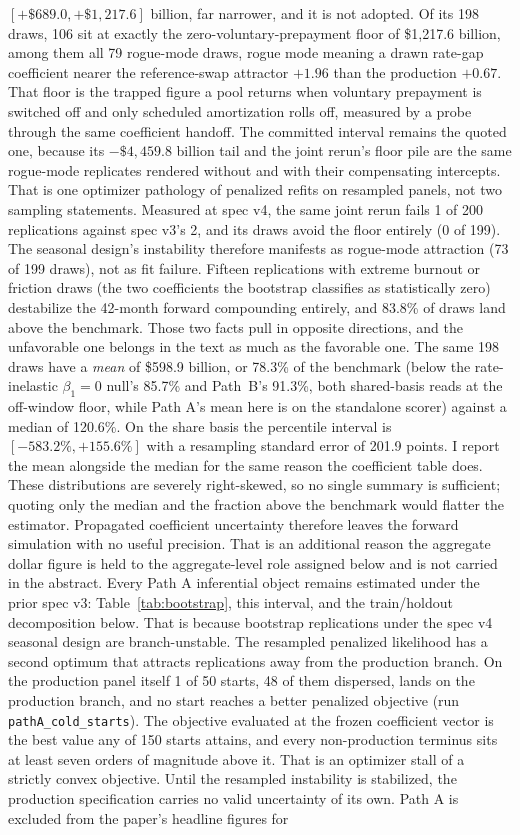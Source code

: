 \documentclass[12pt]{article}
\begin{document}
$[+\$689.0, +\$1{,}217.6]$ billion, far narrower, and it is not adopted. Of its 198 draws, 106 sit at exactly the zero-voluntary-prepayment floor of \$1{,}217.6 billion, among them all 79 rogue-mode draws, rogue mode meaning a drawn rate-gap coefficient nearer the reference-swap attractor $+1.96$ than the production $+0.67$. That floor is the trapped figure a pool returns when voluntary prepayment is switched off and only scheduled amortization rolls off, measured by a probe through the same coefficient handoff. The committed interval remains the quoted one, because its $-\$4{,}459.8$ billion tail and the joint rerun's floor pile are the same rogue-mode replicates rendered without and with their compensating intercepts. That is one optimizer pathology of penalized refits on resampled panels, not two sampling statements. Measured at spec v4, the same joint rerun fails 1 of 200 replications against spec v3's 2, and its draws avoid the floor entirely (0 of 199). The seasonal design's instability therefore manifests as rogue-mode attraction (73 of 199 draws), not as fit failure. Fifteen replications with extreme burnout or friction draws (the two coefficients the bootstrap classifies as statistically zero) destabilize the 42-month forward compounding entirely, and 83.8\% of draws land above the benchmark. Those two facts pull in opposite directions, and the unfavorable one belongs in the text as much as the favorable one. The same 198 draws have a \emph{mean} of \$598.9 billion, or 78.3\% of the benchmark (below the rate-inelastic $\beta_1 = 0$ null's 85.7\% and Path~B's 91.3\%, both shared-basis reads at the off-window floor, while Path A's mean here is on the standalone scorer) against a median of 120.6\%. On the share basis the percentile interval is $[-583.2\%, +155.6\%]$ with a resampling standard error of 201.9 points. I report the mean alongside the median for the same reason the coefficient table does. These distributions are severely right-skewed, so no single summary is sufficient; quoting only the median and the fraction above the benchmark would flatter the estimator. Propagated coefficient uncertainty therefore leaves the forward simulation with no useful precision. That is an additional reason the aggregate dollar figure is held to the aggregate-level role assigned below and is not carried in the abstract. Every Path A inferential object remains estimated under the prior spec v3: Table~\ref{tab:bootstrap}, this interval, and the train/holdout decomposition below. That is because bootstrap replications under the spec v4 seasonal design are branch-unstable. The resampled penalized likelihood has a second optimum that attracts replications away from the production branch. On the production panel itself 1 of 50 starts, 48 of them dispersed, lands on the production branch, and no start reaches a better penalized objective (run \texttt{pathA\_cold\_starts}). The objective evaluated at the frozen coefficient vector is the best value any of 150 starts attains, and every non-production terminus sits at least seven orders of magnitude above it. That is an optimizer stall of a strictly convex objective. Until the resampled instability is stabilized, the production specification carries no valid uncertainty of its own. Path A is excluded from the paper's headline figures for 
\end{document}
